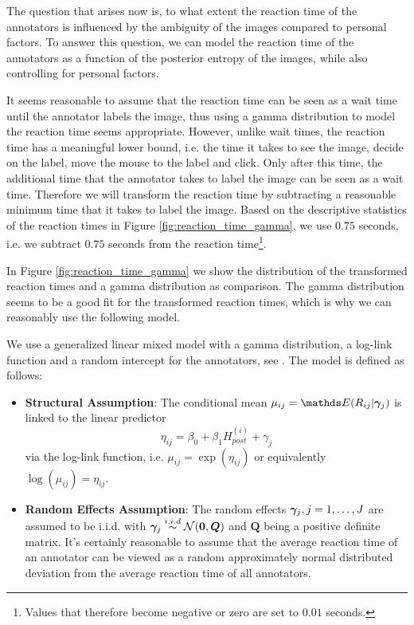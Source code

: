 The question that arises now is, to what extent the reaction time of the annotators is
influenced by the ambiguity of the images compared to personal factors. To answer this
question, we can model the reaction time of the annotators as a function of the posterior
entropy of the images, while also controlling for personal factors.\bigskip

It seems reasonable to assume that the reaction time can be seen as a wait time
until the annotator labels the image, thus using a gamma distribution to model
the reaction time seems appropriate. However, unlike wait times, the reaction
time has a meaningful lower bound, i.e. the time it takes to see the image,
decide on the label, move the mouse to the label and click. Only after this
time, the additional time that the annotator takes to label the image can be
seen as a wait time. Therefore we will transform the reaction time by
subtracting a reasonable minimum time that it takes to label the image. Based on
the descriptive statistics of the reaction times in Figure
\ref{fig:reaction_time_gamma}, we use $0.75$ seconds, i.e. we subtract $0.75$ seconds
from the reaction time\footnote{Values that therefore become negative or zero
are set to $0.01$ seconds.}.\bigskip

In Figure \ref{fig:reaction_time_gamma} we show the distribution of the transformed
reaction times and a gamma distribution as comparison. The gamma distribution
seems to be a good fit for the transformed reaction times, which is why we can reasonably
use the following model.

We use a generalized linear mixed model with a gamma distribution, a log-link
function and a random intercept for the annotators, see
\cite{fahrmeirRegressionModelsMethods2013}. The model is defined as follows:

\begin{itemize}
  \item \textbf{Structural Assumption}: The conditional mean $\mu_{ij} = \E(R_{ij}|\bgamma_{j})$ is
  linked to the linear predictor $$\eta_{ij} = \beta_0 + \beta_1 H_{post}^{(i)} + \gamma_{j}$$
  via the log-link function, i.e. $\mu_{ij} = \exp(\eta_{ij})$ or equivalently $\log(\mu_{ij}) = \eta_{ij}$.
  \item \textbf{Random Effects Assumption}: The random effects $\bm{\gamma}_{j}, j =
  1,\dots,J$ are assumed to be i.i.d. with $\bm{\gamma}_{j} \overset{i.i.d}{\sim}
  \mathcal{N}(\bm{0}, \bm{Q})$ and $\bm{Q}$ being a positive definite matrix. It's
  certainly reasonable to assume that the average reaction time of an annotator
  can be viewed as a random approximately normal distributed deviation from the average
  reaction time of all annotators.
\end{itemize}

